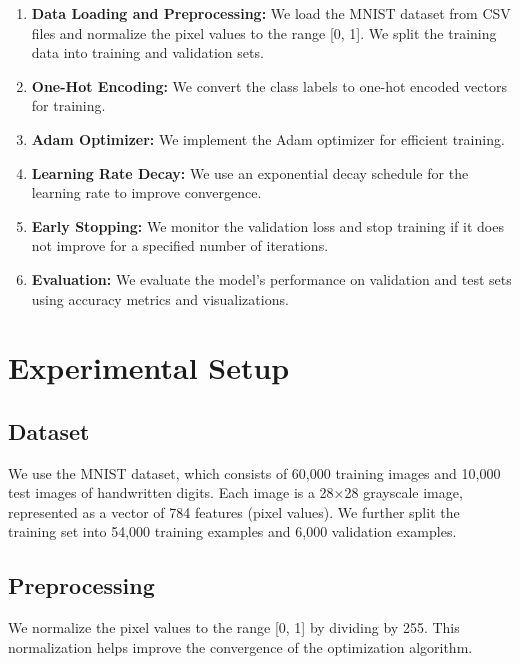 \documentclass[10pt,journal,compsoc]{IEEEtran}
\begin{document}
\begin{enumerate}
    \item \textbf{Data Loading and Preprocessing:} We load the MNIST dataset from CSV files and normalize the pixel values to the range [0, 1]. We split the training data into training and validation sets.
    
    \item \textbf{One-Hot Encoding:} We convert the class labels to one-hot encoded vectors for training.
    
    \item \textbf{Adam Optimizer:} We implement the Adam optimizer for efficient training.
    
    \item \textbf{Learning Rate Decay:} We use an exponential decay schedule for the learning rate to improve convergence.
    
    \item \textbf{Early Stopping:} We monitor the validation loss and stop training if it does not improve for a specified number of iterations.
    
    \item \textbf{Evaluation:} We evaluate the model's performance on validation and test sets using accuracy metrics and visualizations.
\end{enumerate}

\section{Experimental Setup}
\subsection{Dataset}
We use the MNIST dataset, which consists of 60,000 training images and 10,000 test images of handwritten digits. Each image is a 28×28 grayscale image, represented as a vector of 784 features (pixel values). We further split the training set into 54,000 training examples and 6,000 validation examples.

\subsection{Preprocessing}
We normalize the pixel values to the range [0, 1] by dividing by 255. This normalization helps improve the convergence of the optimization algorithm.
\end{document}
